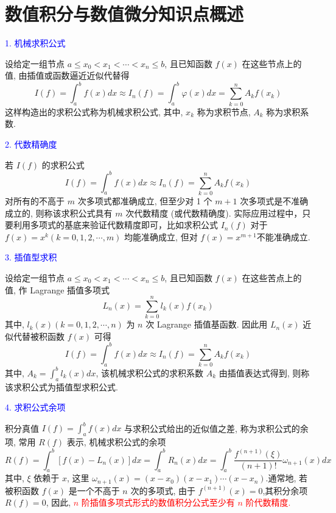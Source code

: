 \newpage
\section{数值积分与数值微分知识点概述}

\textcolor{blue}{1. 机械求积公式}

设给定一组节点 $ a \leqslant x_{0}<x_{1}<\cdots<x_{n} \leqslant b $, 且已知函数 $ f(x) $ 在这些节点上的值, 由插值或函数逼近近似代替得
$$
I(f)=\int_{a}^{b} f(x) d x \approx I_{n}(f)=\int_{a}^{b} \varphi(x) d x=\sum_{k=0}^{n} A_{k} f\left(x_{k}\right)
$$
这样构造出的求积公式称为机械求积公式, 其中, $ x_{k} $ 称为求积节点, $ A_{k} $ 称为求积系数.

\textcolor{blue}{2. 代数精确度}

若 $ I(f) $ 的求积公式
$$
I(f)=\int_{a}^{b} f(x) d x \approx I_{n}(f)=\sum_{k=0}^{n} A_{k} f\left(x_{k}\right)
$$
对所有的不高于 $ m $ 次多项式都准确成立, 但至少对 1 个 $ m+1 $ 次多项式是不准确成立的, 则称该求积公式具有 $ m $ 次代数精度 (或代数精确度). 实际应用过程中，只要利用多项式的基底来验证代数精度即可，比如求积公式 $ I_{n}(f) $ 对于 $ f(x)=x^{k}(k=0,1,2, \cdots, m) $ 均能准确成立, 但对 $ f(x)=x^{m+1} $不能准确成立.

\textcolor{blue}{3. 插值型求积}

设给定一组节点 $ a \leqslant x_{0}<x_{1}<\cdots<x_{n} \leqslant b $, 且已知函数 $ f(x) $ 在这些苦点上的值, 作 Lagrange 插值多项式
$$
L_{n}(x)=\sum_{k=0}^{n} l_{k}(x) f\left(x_{k}\right)
$$
其中, $ l_{k}(x)(k=0,1,2, \cdots, n) $ 为 $ n $ 次 Lagrange 插值基函数. 因此用 $ L_{n}(x) $ 近似代替被积函数 $ f(x) $ 可得
$$
I(f)=\int_{a}^{b} f(x) d x \approx I_{n}(f)=\sum_{k=0}^{n} A_{k} f\left(x_{k}\right)
$$
其中, $ A_{k}=\displaystyle\int_{a}^{b} l_{k}(x) d x $, 该机械求积公式的求积系数 $ A_{k} $ 由插值表达式得到, 则称该求积公式为插值型求积公式.

\textcolor{blue}{4. 求积公式余项}

积分真值 $ I(f)=\int_{a}^{b} f(x) d x $ 与求积公式给出的近似值之差, 称为求积公式的余项, 常用 $ R(f) $ 表示, 机械求积公式的余项
$$
R(f)=\int_{a}^{b}\left[f(x)-L_{n}(x)\right] d x=\int_{a}^{b} R_{n}(x) d x=\int_{a}^{b} \frac{f^{(n+1)}(\xi)}{(n+1)!} \omega_{n+1}(x) d x
$$
其中, $ \xi $ 依赖于 $ x $, 这里 $ \omega_{n+1}(x)=\left(x-x_{0}\right)\left(x-x_{1}\right) \cdots\left(x-x_{n}\right) $.通常地, 若被积函数 $ f(x) $ 是一个不高于 $ n $ 次的多项式, 由于 $ f^{(n+1)}(x)=0 $,其积分余项 $ R(f)=0 $, 因此, \textcolor{red}{$ n $ 阶插值多项式形式的数值积分公式至少有 $ n $ 阶代数精度.}

